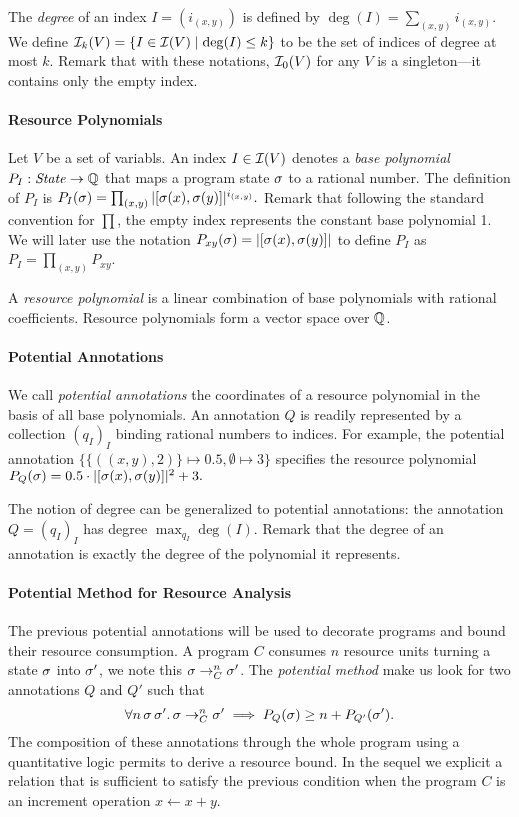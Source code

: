 \documentclass[nocopyrightspace,preprint]{sigplanconf-pldi15}
\begin{document}
The \emph{degree} of an index $I = (i_{(x,y)})$
is defined by
$
\deg(I) = \sum_{(x,y)} i_{(x,y)}.
$
We define $\mathcal{I}_k(V) = \{ I \in \mathcal{I}(V) \mid \deg(I) \leq k
\}$ to be the set of indices of degree at most $k$.  Remark
that with these notations, $\mathcal{I}_0(V)$ for any $V$ is a
singleton---it contains only the empty index.

\paragraph{Resource Polynomials}

Let $V$ be a set of variabls.  An index $I \in \mathcal{I}(V)$ denotes a
\emph{base polynomial} $P_I : \mathit{State} \to \mathbb{Q}$ that maps a program
state $\sigma$ to a rational number.  The definition of $P_I$ is
$
P_I(\sigma) = \prod_{(x,y)} |[\sigma(x),\sigma(y)]|^{i_{(x,y)}}.
$
Remark that following the standard convention for $\prod$, the
empty index represents the constant base polynomial 1.  We will
later use the notation $P_{xy}(\sigma) = |[\sigma(x),\sigma(y)]|$
to define $P_I$ as $P_I = \prod_{(x,y)} P_{xy}$.

A \emph{resource polynomial} is a linear combination of
base polynomials with rational coefficients.  Resource polynomials
form a vector space over $\mathbb{Q}$.

\paragraph{Potential Annotations}

We call \emph{potential annotations}
the coordinates of a resource polynomial in the basis of
all base polynomials.  An annotation $Q$ is readily represented
by a collection $(q_I)_I$ binding rational numbers to indices.
For example, the potential annotation $\{\{((x,y),2)\} \mapsto 0.5,
\emptyset \mapsto 3\}$ specifies the resource polynomial
$
  P_Q(\sigma) = 0.5\cdot|[\sigma(x),\sigma(y)]|^2 + 3.
$

The notion of degree can be generalized to potential annotations:
the annotation $Q = (q_I)_I$ has degree $\max_{q_I} \deg(I)$.
Remark that the degree of an annotation is exactly the degree of
the polynomial it represents.

\paragraph{Potential Method for Resource Analysis}

The previous potential annotations will be used to decorate
programs and bound their resource consumption.  A program
$C$ consumes $n$ resource units turning a state $\sigma$ into $\sigma'$,
we note this $\sigma \rightarrow^n_C \sigma'$.  The \emph{potential
method} make us look for two annotations $Q$ and $Q'$ such
that
$$
  \forall n\, \sigma\, \sigma'.\, \sigma \rightarrow^n_C \sigma'
    \implies P_Q(\sigma) \ge n + P_{Q'}(\sigma').
$$
The composition of these annotations through the whole program
using a quantitative logic permits to derive a resource bound.
In the sequel we explicit a relation that is sufficient to
satisfy the previous condition when the program $C$ is an
increment operation $x \gets x+y$.
\end{document}
